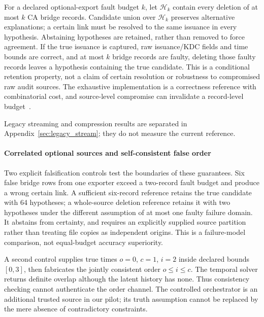 For a declared optional-export fault budget $k$, let $\mathcal{H}_k$ contain every deletion of at most $k$ CA bridge records. Candidate union over $\mathcal{H}_k$ preserves alternative explanations; a certain link must be resolved to the same issuance in every hypothesis. Abstaining hypotheses are retained, rather than removed to force agreement. If the true issuance is captured, raw issuance/KDC fields and time bounds are correct, and at most $k$ bridge records are faulty, deleting those faulty records leaves a hypothesis containing the true candidate. This is a conditional retention property, not a claim of certain resolution or robustness to compromised raw audit sources. The exhaustive implementation is a correctness reference with combinatorial cost, and source-level compromise can invalidate a record-level budget~\cite{elmagarmid2007duplicate,heinzl2026timestamps}.

Legacy streaming and compression results are separated in Appendix~\ref{sec:legacy_stream}; they do not measure the current reference.

\paragraph{Correlated optional sources and self-consistent false order}
Two explicit falsification controls test the boundaries of these guarantees. Six false bridge rows from one exporter exceed a two-record fault budget and produce a wrong certain link. A sufficient six-record reference retains the true candidate with 64 hypotheses; a whole-source deletion reference retains it with two hypotheses under the different assumption of at most one faulty failure domain. It abstains from certainty, and requires an explicitly supplied source partition rather than treating file copies as independent origins. This is a failure-model comparison, not equal-budget accuracy superiority.

A second control supplies true times $o=0$, $c=1$, $i=2$ inside declared bounds $[0,3]$, then fabricates the jointly consistent order $o\le i\le c$. The temporal solver returns definite overlap although the latent history has none. Thus consistency checking cannot authenticate the order channel. The controlled orchestrator is an additional trusted source in our pilot; its truth assumption cannot be replaced by the mere absence of contradictory constraints.

